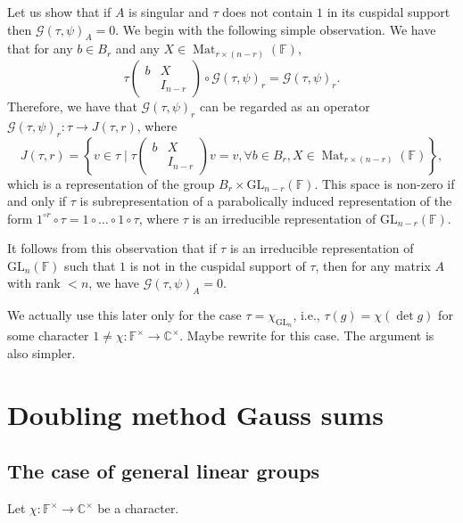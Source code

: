 \documentclass[12pt, reqno]{amsart}
\theoremstyle{definition}
\theoremstyle{definition}
\theoremstyle{definition}
\newcommand{\cComplex}{\mathbb{C}}
\newcommand{\multiplicativegroup}[1]{#1^{\times}}
\newcommand{\fieldCharacter}{\psi}
\newcommand{\IdentityMatrix}[1]{I_{#1}}
\newcommand{\GL}{\mathrm{GL}}
\newcommand{\finiteField}{\mathbb{F}}
\newcommand{\Mat}[2]{\operatorname{Mat}_{#1 \times #2}}
\newcommand{\GaussSum}[2]{\mathcal{G}\left(#1, #2\right)}
\begin{document}
Let us show that if $A$ is singular and $\tau$ does not contain $1$ in its cuspidal support then $\GaussSum{\tau}{\fieldCharacter}_A = 0$. We begin with the following simple observation. We have that for any $b \in B_r$ and any $X \in \Mat{r}{(n-r)}\left(\finiteField\right)$,
$$ \tau\begin{pmatrix}
	b & X\\
	& \IdentityMatrix{n-r}
\end{pmatrix} \circ \GaussSum{\tau}{\fieldCharacter}_r = \GaussSum{\tau}{\fieldCharacter}_r.$$
Therefore, we have that $\GaussSum{\tau}{\fieldCharacter}_r$ can be regarded as an operator $\GaussSum{\tau}{\fieldCharacter}_r \colon \tau \to J\left(\tau, r\right)$, where $$J\left(\tau, r\right) = \left\{ v \in \tau \mid \tau \begin{pmatrix}
	b & X\\
	& \IdentityMatrix{n-r}
\end{pmatrix} v = v, \forall b \in B_r, X \in \Mat{r}{(n-r)}\left(\finiteField\right) \right\},$$
which is a representation of the group $B_r \times \GL_{n-r}\left(\finiteField\right)$. This space is non-zero if and only if $\tau$ is subrepresentation of a parabolically induced representation of the form $1^{\circ r} \circ \tau = 1 \circ \dots \circ 1 \circ \tau$, where $\tau$ is an irreducible representation of $\GL_{n-r}\left(\finiteField\right)$. 

It follows from this observation that if $\tau$ is an irreducible representation of $\GL_n\left(\finiteField\right)$ such that $1$ is not in the cuspidal support of $\tau$, then for any matrix $A$ with rank $< n$, we have $\GaussSum{\tau}{\fieldCharacter}_A = 0$.

We actually use this later only for the case $\tau = \chi_{\GL_n}$, i.e., $\tau\left(g\right) = \chi\left(\det g\right)$ for some character $1 \ne \chi \colon \multiplicativegroup{\finiteField} \to \multiplicativegroup{\cComplex}$. Maybe rewrite for this case. The argument is also simpler.

\section{Doubling method Gauss sums}

\subsection{The case of general linear groups}

Let $\chi \colon \multiplicativegroup{\finiteField} \to \multiplicativegroup{\cComplex}$ be a character.
\end{document}
